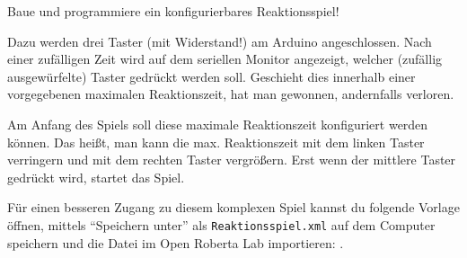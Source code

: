 \bigskip
\begin{projekt}\label{proj:reaktionsspiel}
	Baue und programmiere ein konfigurierbares Reaktionsspiel!
	
	\begin{figure}
	\end{figure}
	
	\medskip
	Dazu werden drei Taster (mit Widerstand!) am Arduino angeschlossen. Nach einer zufälligen Zeit wird auf dem seriellen Monitor angezeigt, welcher (zufällig ausgewürfelte) Taster gedrückt werden soll. Geschieht dies innerhalb einer vorgegebenen maximalen Reaktionszeit, hat man gewonnen, andernfalls verloren.
	
	Am Anfang des Spiels soll diese maximale Reaktionszeit konfiguriert werden können. Das heißt, man kann die max. Reaktionszeit mit dem linken Taster verringern und mit dem rechten Taster vergrößern. Erst wenn der mittlere Taster gedrückt wird, startet das Spiel.
	
	\medskip
	Für einen besseren Zugang zu diesem komplexen Spiel kannst du folgende Vorlage öffnen, mittels \enquote{Speichern unter} als \texttt{Reaktionsspiel.xml} auf dem Computer speichern und die Datei im Open Roberta Lab importieren:
	.
\end{projekt}

